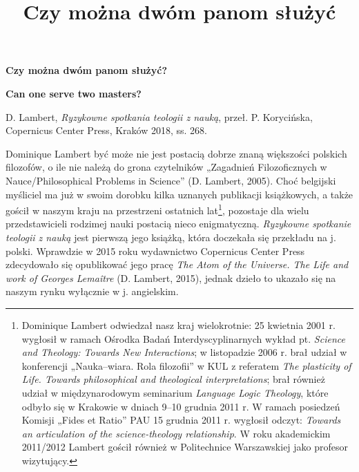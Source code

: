 \documentclass[a4paper]{article}
\title{Czy można dwóm panom służyć}
\begin{document}
{\centering\bfseries
Czy można dwóm panom służyć?
\par}

{\centering\bfseries
Can one serve two masters?
\par}

D. Lambert, \textit{Ryzykowne spotkania teologii z nauką}, przeł. P. Korycińska, Copernicus Center Press, Kraków 2018,
ss. 268.

Dominique Lambert być może nie jest postacią dobrze znaną większości polskich filozofów, o ile nie należą do grona
czytelników „Zagadnień Filozoficznych w Nauce/Philosophical Problems in Science” \label{ref:RND4nFmuMtOI8}(D. Lambert,
2005). Choć belgijski myśliciel ma już w swoim dorobku kilka uznanych publikacji książkowych, a także gościł w naszym
kraju na przestrzeni ostatnich lat\footnote{ Dominique Lambert odwiedzał nasz kraj wielokrotnie: 25 kwietnia 2001 r.
wygłosił w ramach Ośrodka Badań Interdyscyplinarnych wykład pt. \textit{Science and Theology: Towards New
Interactions}; w listopadzie 2006 r. brał udział w konferencji „Nauka–wiara. Rola filozofii” w KUL z referatem
\textit{The plasticity of Life. Towards philosophical and theological interpretations}; brał również udział w
międzynarodowym seminarium \textit{Language Logic Theology}, które odbyło się w Krakowie w dniach 9–10 grudnia 2011 r.
W ramach posiedzeń Komisji „Fides et Ratio” PAU 15 grudnia 2011 r. wygłosił odczyt: \textit{Towards an articulation of
the science-theology relationship}. W roku akademickim 2011/2012 Lambert gościł również w Politechnice Warszawskiej
jako profesor wizytujący. }, pozostaje dla wielu przedstawicieli rodzimej nauki postacią nieco enigmatyczną.
\textit{Ryzykowne spotkanie teologii z nauką} jest pierwszą jego książką, która doczekała się przekładu na j. polski.
Wprawdzie w 2015 roku wydawnictwo Copernicus Center Press zdecydowało się opublikować jego pracę \textit{The Atom of
the Universe. The Life and work of Georges Lemaître }\label{ref:RNDSW3c1asqkN}(D. Lambert, 2015), jednak dzieło to
ukazało się na naszym rynku wyłącznie w j. angielskim. 
\end{document}
